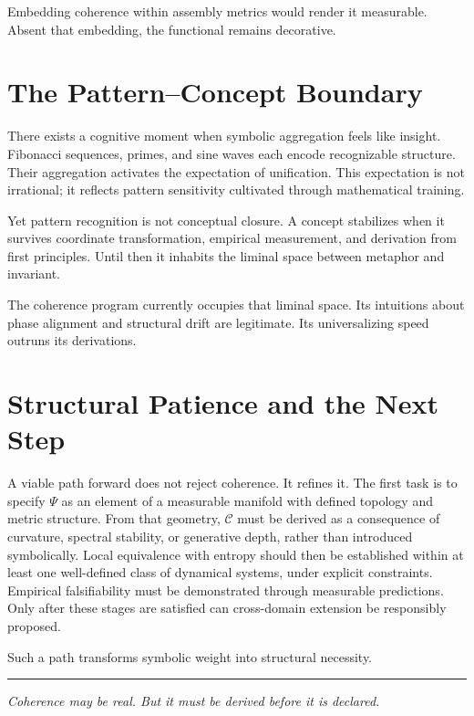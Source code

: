 \documentclass[12pt]{article}
\begin{document}
Embedding coherence within assembly metrics would render it measurable. Absent that embedding, the functional remains decorative.

\section{The Pattern–Concept Boundary}

There exists a cognitive moment when symbolic aggregation feels like insight. Fibonacci sequences, primes, and sine waves each encode recognizable structure. Their aggregation activates the expectation of unification. This expectation is not irrational; it reflects pattern sensitivity cultivated through mathematical training.

Yet pattern recognition is not conceptual closure. A concept stabilizes when it survives coordinate transformation, empirical measurement, and derivation from first principles. Until then it inhabits the liminal space between metaphor and invariant.

The coherence program currently occupies that liminal space. Its intuitions about phase alignment and structural drift are legitimate. Its universalizing speed outruns its derivations.

\section{Structural Patience and the Next Step}

A viable path forward does not reject coherence. It refines it. The first task is to specify $\Psi$ as an element of a measurable manifold with defined topology and metric structure. From that geometry, $\mathcal{C}$ must be derived as a consequence of curvature, spectral stability, or generative depth, rather than introduced symbolically. Local equivalence with entropy should then be established within at least one well-defined class of dynamical systems, under explicit constraints. Empirical falsifiability must be demonstrated through measurable predictions. Only after these stages are satisfied can cross-domain extension be responsibly proposed.

Such a path transforms symbolic weight into structural necessity.

\bigskip
\hrule
\bigskip

\begin{center}
\small\itshape
Coherence may be real.  
But it must be derived before it is declared.
\end{center}
\end{document}
